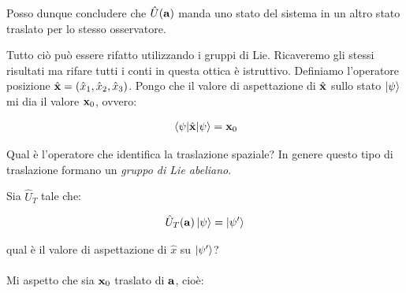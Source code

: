 	Posso dunque concludere che $\hat{U}(\vb{a})$ manda uno stato del sistema in un altro stato traslato per lo stesso osservatore.

\vspace{1em}
\begin{minipage}{0.5\textwidth}
\end{minipage}
\hfill
\begin{minipage}{0.5\textwidth}

	Tutto ciò può essere rifatto utilizzando i gruppi di Lie. Ricaveremo gli stessi risultati ma rifare tutti i conti in questa ottica è istruttivo. Definiamo l'operatore posizione $\hat{\vb{x}} = \qty(\hat{x}_1, \hat{x}_2, \hat{x}_3)$. Pongo che il valore di aspettazione di $\hat{\vb{x}}$ sullo stato $\ket{\psi}$ mi dia il valore $\vb{x}_0$, ovvero:
	
\begin{align*}
	\mel{\psi}{\hat{\vb{x}}}{\psi} = \vb{x}_0
\end{align*}

	Qual è l'operatore che identifica la traslazione spaziale? In genere questo tipo di traslazione formano un \textit{gruppo di Lie abeliano}.
	
\end{minipage}

\vspace{1em}

	Sia $\hat{U}_T$ tale che:
	
\begin{align*}
	\hat{U}_T(\vb{a}) \ket{\psi} = \ket{\psi'}
\end{align*}

	qual è il valore di aspettazione di $\hat{x}$ su $\ket{\psi'}$?
	\\
	\\
	Mi aspetto che sia $\vb{x}_0$ traslato di $\vb{a}$, cioè:
	
